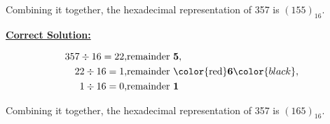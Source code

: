 \documentclass[12pt]{article}
\begin{document}
\begin{enumerate}[a.]
    Combining it together, the hexadecimal representation of 357 is $(155)_{16}$.

    \begin{mdframed}
        \underline{\textbf{Correct Solution:}}

        \bigskip

        \begin{align*}
            357 \div 16 = 22, &\text{remainder \textbf{5}},\\
            22 \div 16 = 1, &\text{remainder \color{red}\textbf{6}}\color{black},\\
            1 \div 16 = 0, &\text{remainder \textbf{1}}
        \end{align*}

        Combining it together, the hexadecimal representation of 357 is \color{red}\textbf{$(165)_{16}$}\color{black}.

    \end{mdframed}

\end{enumerate}
\end{document}
